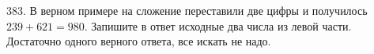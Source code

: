 383. В верном примере на сложение переставили две цифры и получилось $239+621=980.$ Запишите в ответ исходные два числа из левой части. Достаточно одного верного ответа, все искать не надо.\\
